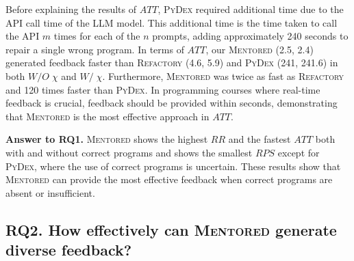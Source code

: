 \documentclass[10pt,conference]{IEEEtran}
\begin{document}
        Before explaining the results of $ATT$, \textsc{PyDex} required additional time due to the API call time of the LLM model. This additional time is the time taken to call the API $m$ times for each of the $n$ prompts, adding approximately 240 seconds to repair a single wrong program. In terms of $ATT$, our \textsc{Mentored} (2.5, 2.4) generated feedback faster than \textsc{Refactory} (4.6, 5.9) and \textsc{PyDex} (241, 241.6) in both $W/O\;\chi$ and $W/\;\chi$. Furthermore, \textsc{Mentored} was twice as fast as \textsc{Refactory} and 120 times faster than \textsc{PyDex}. In programming courses where real-time feedback is crucial, feedback should be provided within seconds, demonstrating that \textsc{Mentored} is the most effective approach in $ATT$.

        \begin{tcolorbox}
            \textbf{Answer to RQ1.}
            \textsc{Mentored} shows the highest $RR$ and the fastest $ATT$ both with and without correct programs and shows the smallest $RPS$ except for \textsc{PyDex}, where the use of correct programs is uncertain. These results show that \textsc{Mentored} can provide the most effective feedback when correct programs are absent or insufficient.
        \end{tcolorbox}



    \subsection{RQ2. How effectively can \textsc{Mentored} generate diverse feedback?}
\end{document}

